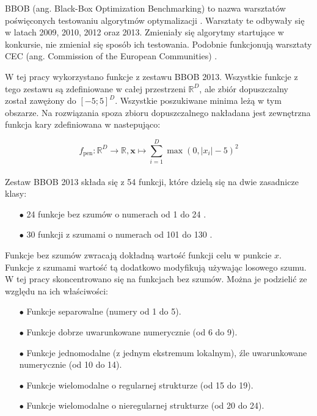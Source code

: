 \documentclass[a4paper,onecolumn,oneside,12pt,wide,floatssmall]{mwrep}
\theoremstyle{definition}
\theoremstyle{plain}%
\theoremstyle{remark}
\begin{document}
BBOB (ang. Black-Box Optimization Benchmarking) to nazwa warsztatów poświęconych testowaniu 
algorytmów optymalizacji \cite{setup}. 
Warsztaty te odbywały się w latach 2009, 2010, 2012 oraz 2013. 
Zmieniały się algorytmy startujące w konkursie, nie zmieniał
się sposób ich testowania. Podobnie funkcjonują warsztaty CEC (ang. Commission of the European Communities)
\cite{cec}.

W tej pracy wykorzystano funkcje z zestawu BBOB 2013. Wszystkie funkcje z tego zestawu
są zdefiniowane w całej przestrzeni $\mathbb{R}^D$, 
ale zbiór dopuszczalny został zawężony do $[-5; 5]^D$. 
Wszystkie poszukiwane minima leżą w tym obszarze.
Na rozwiązania spoza zbioru dopuszczalnego 
nakładana jest zewnętrzna funkcja kary zdefiniowana w \cite{setup} nastepująco: 

$$ f_\text{pen} : \mathbb{R}^D \rightarrow \mathbb{R}, 
\textbf{x} \mapsto \sum\limits_{i=1}^D \max\left(0, |x_i| - 5\right)^2 $$ 
\\
Zestaw BBOB 2013 składa się z 54 funkcji, które dzielą się na dwie zasadnicze klasy:

\begin{itemize}
 \item[$\bullet$] 24 funkcje bez szumów o numerach od 1 do 24 \cite{noiseless}. 
 \item[$\bullet$] 30 funkcji z szumami o numerach od 101 do 130 \cite{noisy}.
\end{itemize} 

Funkcje bez szumów zwracają dokładną wartość funkcji celu w punkcie $x$. Funkcje z szumami wartość tą dodatkowo modyfikują używając 
losowego szumu. W tej pracy skoncentrowano się na funkcjach bez szumów. Można je podzielić ze względu
na ich właściwości:

\begin{itemize}
 \item[$\bullet$] Funkcje separowalne (numery od 1 do 5).
 \item[$\bullet$] Funkcje dobrze uwarunkowane numerycznie (od 6 do 9).
 \item[$\bullet$] Funkcje jednomodalne (z jednym ekstremum lokalnym), źle uwarunkowane numerycznie (od 10 do 14).
 \item[$\bullet$] Funkcje wielomodalne o regularnej strukturze (od 15 do 19).
 \item[$\bullet$] Funkcje wielomodalne o nieregularnej strukturze (od 20 do 24).
\end{itemize} 
\end{document}
